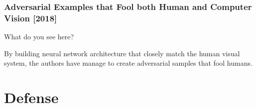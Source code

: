 \documentclass[9pt]{beamer}
\begin{document}
\begin{frame}
  \frametitle{Adversarial Examples that Fool both Human and Computer
    Vision [2018]}

  What do you see here?

  \begin{center}
  \end{center}


  By building neural network architecture that closely match the human
  visual system, the authors have manage to create adversarial samples
  that fool humans.
\end{frame}

\section{Defense}
\end{document}
